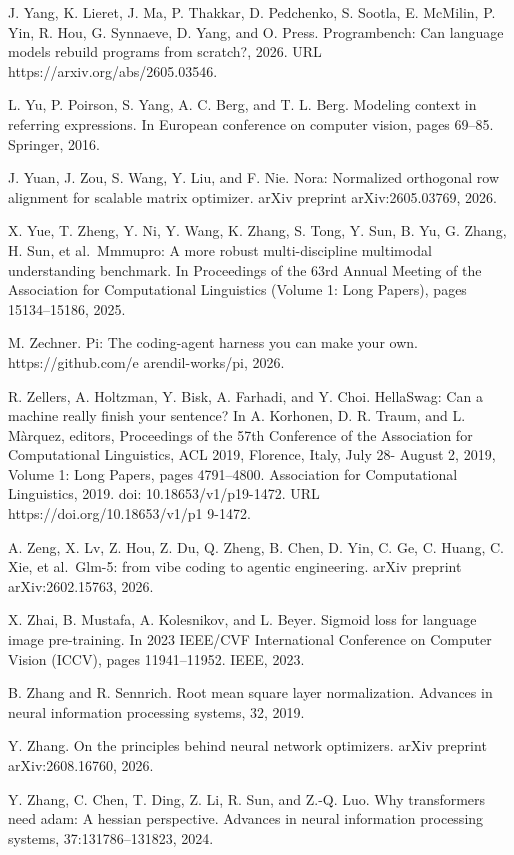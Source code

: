 \documentclass[
  10
]{article}
\begin{document}
J. Yang, K. Lieret, J. Ma, P. Thakkar, D. Pedchenko, S. Sootla, E.
McMilin, P. Yin, R. Hou, G. Synnaeve, D. Yang, and O. Press.
Programbench: Can language models rebuild programs from scratch?, 2026.
URL https://arxiv.org/abs/2605.03546.

L. Yu, P. Poirson, S. Yang, A. C. Berg, and T. L. Berg. Modeling context
in referring expressions. In European conference on computer vision,
pages 69--85. Springer, 2016.

J. Yuan, J. Zou, S. Wang, Y. Liu, and F. Nie. Nora: Normalized
orthogonal row alignment for scalable matrix optimizer. arXiv preprint
arXiv:2605.03769, 2026.

X. Yue, T. Zheng, Y. Ni, Y. Wang, K. Zhang, S. Tong, Y. Sun, B. Yu, G.
Zhang, H. Sun, et al.~Mmmupro: A more robust multi-discipline multimodal
understanding benchmark. In Proceedings of the 63rd Annual Meeting of
the Association for Computational Linguistics (Volume 1: Long Papers),
pages 15134--15186, 2025.

M. Zechner. Pi: The coding-agent harness you can make your own.
https://github.com/e arendil-works/pi, 2026.

R. Zellers, A. Holtzman, Y. Bisk, A. Farhadi, and Y. Choi. HellaSwag:
Can a machine really finish your sentence? In A. Korhonen, D. R. Traum,
and L. Màrquez, editors, Proceedings of the 57th Conference of the
Association for Computational Linguistics, ACL 2019, Florence, Italy,
July 28- August 2, 2019, Volume 1: Long Papers, pages 4791--4800.
Association for Computational Linguistics, 2019. doi:
10.18653/v1/p19-1472. URL https://doi.org/10.18653/v1/p1 9-1472.

A. Zeng, X. Lv, Z. Hou, Z. Du, Q. Zheng, B. Chen, D. Yin, C. Ge, C.
Huang, C. Xie, et al.~Glm-5: from vibe coding to agentic engineering.
arXiv preprint arXiv:2602.15763, 2026.

X. Zhai, B. Mustafa, A. Kolesnikov, and L. Beyer. Sigmoid loss for
language image pre-training. In 2023 IEEE/CVF International Conference
on Computer Vision (ICCV), pages 11941--11952. IEEE, 2023.

B. Zhang and R. Sennrich. Root mean square layer normalization. Advances
in neural information processing systems, 32, 2019.

Y. Zhang. On the principles behind neural network optimizers. arXiv
preprint arXiv:2608.16760, 2026.

Y. Zhang, C. Chen, T. Ding, Z. Li, R. Sun, and Z.-Q. Luo. Why
transformers need adam: A hessian perspective. Advances in neural
information processing systems, 37:131786--131823, 2024.
\end{document}
